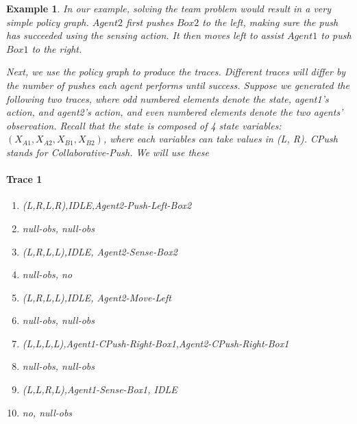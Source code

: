 \documentclass[letterpaper]{article} %
\newtheorem{example}{Example}
\newcommand{\eliran}[1]{\textbf{[\color{red}ELIRAN:#1]}}
\begin{document}

\begin{example}
In our example, solving the team problem would result in a very simple policy graph. 
$Agent2$ first pushes $Box2$ to the left, making sure the push has succeeded using the sensing action. It then moves left to assist $Agent1$ to push $Box1$ to the right.

Next, we use the policy graph to produce the traces. Different
traces will differ by the number of pushes each agent performs until success.
Suppose we generated the following two traces, where odd numbered elements
denote the state, agent1's action, and agent2's action, and even numbered
elements denote the two agents' observation. Recall that the state is composed of 4 state variables: $(X_{A1}, X_{A2}, X_{B1}, X_{B2})$, where each variables can take values in \emph{(L, R)}. \emph{CPush} stands for Collaborative-Push. We will use these 

\paragraph{Trace 1}
\begin{enumerate}
    \item \emph{(L,R,L,R),IDLE,Agent2-Push-Left-Box2}
    \item \emph{null-obs, null-obs}
    \item \emph{(L,R,L,L),IDLE, Agent2-Sense-Box2}
    \item \emph{null-obs, no}
    \item \emph{(L,R,L,L),IDLE, Agent2-Move-Left}
    \item \emph{null-obs, null-obs}
    \item \emph{(L,L,L,L),Agent1-CPush-Right-Box1,Agent2-CPush-Right-Box1}
    \item \emph{null-obs, null-obs}
    \item \emph{(L,L,R,L),Agent1-Sense-Box1, IDLE}
    \item \emph{no, null-obs}
\end{enumerate}

\end{example}
\end{document}
